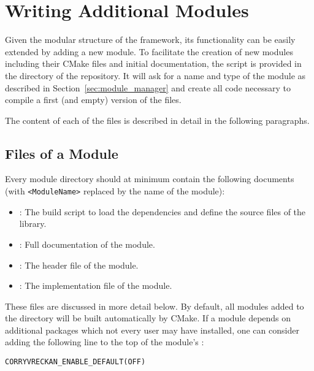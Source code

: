 \section{Writing Additional Modules}

Given the modular structure of the framework, its functionality can be easily extended by adding a new module.
To facilitate the creation of new modules including their CMake files and initial documentation, the script  is provided in the  directory of the repository.
It will ask for a name and type of the module as described in Section~\ref{sec:module_manager} and create all code necessary to compile a first (and empty) version of the files.

The content of each of the files is described in detail in the following paragraphs.

\subsection{Files of a Module}
\label{sec:module_files}
Every module directory should at minimum contain the following documents (with \texttt{<ModuleName>} replaced by the name of the module):
\begin{itemize}
\item \textbf{}: The build script to load the dependencies and define the source files of the library.
\item \textbf{}: Full documentation of the module.
\item \textbf{}: The header file of the module.
\item \textbf{}: The implementation file of the module.
\end{itemize}
These files are discussed in more detail below.
By default, all modules added to the  directory will be built automatically by CMake.
If a module depends on additional packages which not every user may have installed, one can consider adding the following line to the top of the module's :
\begin{verbatim}
CORRYVRECKAN_ENABLE_DEFAULT(OFF)
\end{verbatim}

